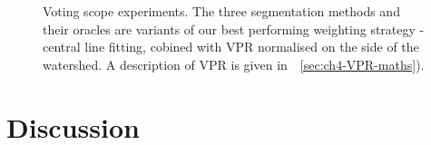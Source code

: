 \begin{figure}[ht!]
\centering
\caption{Voting scope experiments. The three segmentation methods and their oracles are variants of our best performing weighting strategy - central line fitting, cobined with VPR normalised on the side of the watershed. A description of VPR is given in~\textsection~\ref{sec:ch4-VPR-maths}).}
\label{fig:voting-scope-line-centre-VPR-ws}
\end{figure}

\section{Discussion}

